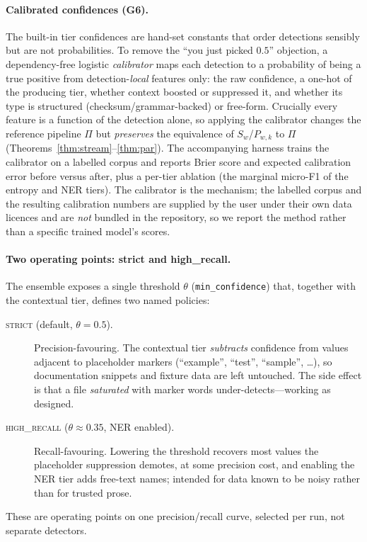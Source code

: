 \documentclass[runningheads]{llncs}
\newcommand{\Pipe}{\Pi}
\newcommand{\Sw}{S_{w}}
\newcommand{\Pwk}{P_{w,k}}
\begin{document}
\paragraph{Calibrated confidences (G6).}
The built-in tier confidences are hand-set constants that order detections
sensibly but are not probabilities. To remove the ``you just picked $0.5$''
objection, a dependency-free logistic \emph{calibrator} maps each detection to a
probability of being a true positive from detection-\emph{local} features only:
the raw confidence, a one-hot of the producing tier, whether context boosted or
suppressed it, and whether its type is structured (checksum/grammar-backed) or
free-form. Crucially every feature is a function of the detection alone, so
applying the calibrator changes the reference pipeline $\Pipe$ but
\emph{preserves} the equivalence of $\Sw$/$\Pwk$ to $\Pipe$
(Theorems~\ref{thm:stream}--\ref{thm:par}). The accompanying harness trains the
calibrator on a labelled corpus and reports Brier score and expected calibration
error before versus after, plus a per-tier ablation (the marginal micro-F1 of the
entropy and NER tiers). The calibrator is the mechanism; the labelled corpus and
the resulting calibration numbers are supplied by the user under their own data
licences and are \emph{not} bundled in the repository, so we report the method
rather than a specific trained model's scores.

\paragraph{Two operating points: strict and high\_recall.}
The ensemble exposes a single threshold $\theta$ (\texttt{min\_confidence}) that,
together with the contextual tier, defines two named policies:
\begin{description}
\item[\textsc{strict} (default, $\theta=0.5$).] Precision-favouring. The
contextual tier \emph{subtracts} confidence from values adjacent to placeholder
markers (``example'', ``test'', ``sample'', \ldots), so documentation snippets
and fixture data are left untouched. The side effect is that a file
\emph{saturated} with marker words under-detects---working as designed.
\item[\textsc{high\_recall} ($\theta\approx0.35$, NER enabled).] Recall-favouring.
Lowering the threshold recovers most values the placeholder suppression demotes,
at some precision cost, and enabling the NER tier adds free-text names; intended
for data known to be noisy rather than for trusted prose.
\end{description}
These are operating points on one precision/recall curve, selected per run, not
separate detectors.
\end{document}
